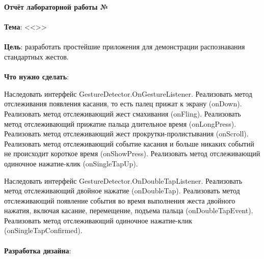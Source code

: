 \documentclass[12pt, a4paper, simple]{eskdtext}
\def \gpiDocTopic {Отчёт лабораторной работы №\gpiDocNum}
\begin{document}
    
    \begin{center}
        \textbf{\gpiDocTopic}
    \end{center}

    \paragraph{} \textbf{Тема}: <<\gpiTopicRep>>

    \paragraph{} \textbf{Цель}: разработать простейшие приложения для демонстрации распознавания стандартных жестов.

    \paragraph{} \textbf{Что нужно сделать}:

    Наследовать интерфейс GestureDetector.OnGestureListener.
    Реализовать метод отслеживания появления касания, то есть палец прижат к экрану (onDown).
    Реализовать метод отслеживающий жест смахивания (onFling).
    Реализовать метод отслеживающий прижатие пальца длительное время (onLongPress).
    Реализовать метод отслеживающий жест прокрутки-пролистывания (onScroll).
    Реализовать метод отслеживающий событие касания и больше никаких событий не происходит короткое время (onShowPress).
    Реализовать метод отслеживающий одиночное нажатие-клик (onSingleTapUp).
    
    Наследовать интерфейс GestureDetector.OnDoubleTapListener.
    Реализовать метод отслеживающий двойное нажатие (onDoubleTap).
    Реализовать метод отслеживающий появление события во время выполнения жеста двойного нажатия,
    включая касание, перемещение, подъема пальца (onDoubleTapEvent).
    Реализовать метод отслеживающий одиночное нажатие-клик (onSingleTapConfirmed).

    \paragraph{} \textbf{Разработка дизайна}:
\end{document}
